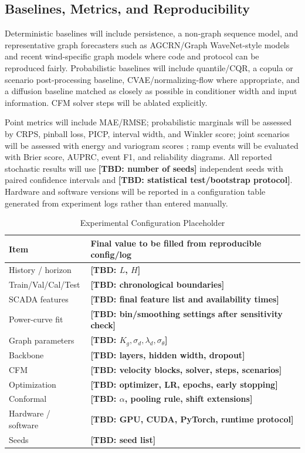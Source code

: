 \documentclass[journal]{IEEEtran}
\newcommand{\TBD}[1]{\textbf{[TBD: #1]}}
\newcommand{\1}{\mathbb{I}}
\begin{document}
\subsection{Baselines, Metrics, and Reproducibility}
Deterministic baselines will include persistence, a non-graph sequence model, and representative graph forecasters such as AGCRN/Graph WaveNet-style models and recent wind-specific graph models where code and protocol can be reproduced fairly. Probabilistic baselines will include quantile/CQR, a copula or scenario post-processing baseline, CVAE/normalizing-flow where appropriate, and a diffusion baseline matched as closely as possible in conditioner width and input information. CFM solver steps will be ablated explicitly.

Point metrics will include MAE/RMSE; probabilistic marginals will be assessed by CRPS, pinball loss, PICP, interval width, and Winkler score; joint scenarios will be assessed with energy and variogram scores \cite{gneiting2007proper,scheuerer2015variogram}; ramp events will be evaluated with Brier score, AUPRC, event F1, and reliability diagrams. All reported stochastic results will use \TBD{number of seeds} independent seeds with paired confidence intervals and \TBD{statistical test/bootstrap protocol}. Hardware and software versions will be reported in a configuration table generated from experiment logs rather than entered manually.

\begin{table}[t]
\centering
\caption{Experimental Configuration Placeholder}
\label{tab:config}
\scriptsize
\begin{tabular}{p{}p{}}
\toprule
Item & Final value to be filled from reproducible config/log \\
\midrule
History / horizon & \TBD{$L$, $H$} \\
Train/Val/Cal/Test & \TBD{chronological boundaries} \\
SCADA features & \TBD{final feature list and availability times} \\
Power-curve fit & \TBD{bin/smoothing settings after sensitivity check} \\
Graph parameters & \TBD{$K_g,\sigma_d,\lambda_d,\sigma_\theta$} \\
Backbone & \TBD{layers, hidden width, dropout} \\
CFM & \TBD{velocity blocks, solver, steps, scenarios} \\
Optimization & \TBD{optimizer, LR, epochs, early stopping} \\
Conformal & \TBD{$\alpha$, pooling rule, shift extensions} \\
Hardware / software & \TBD{GPU, CUDA, PyTorch, runtime protocol} \\
Seeds & \TBD{seed list} \\
\bottomrule
\end{tabular}
\end{table}
\end{document}

